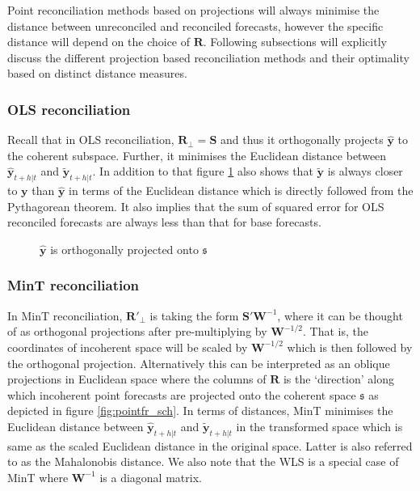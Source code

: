 \documentclass[12pt]{article}
\theoremstyle{definition}
\begin{document}
	Point reconciliation methods based on projections will always minimise the distance between unreconciled and reconciled forecasts, however the specific distance will depend on the choice of $\bm{R}$. Following subsections will explicitly discuss the different projection based reconciliation methods and their optimality based on distinct distance measures. 
	
	\subsubsection{OLS reconciliation}
	
	Recall that in OLS reconciliation, $\bm{R}_\perp=\bm{S}$ and thus it orthogonally projects $\hat{\bm{y}}$ to the coherent subspace. Further, it minimises the Euclidean distance between $\hat{\bm{y}}_{t+h|t}$ and $\tilde{\bm{y}}_{t+h|t}$. In addition to that figure \ref{fig:Schematic_OLSRecon} also shows that $\tilde{\bm{y}}$ is always closer to $\bm{y}$ than $\hat{\bm{y}}$ in terms of the Euclidean distance which is directly followed from the Pythagorean theorem. It also implies that the sum of squared error for OLS reconciled forecasts are always less than that for base forecasts.    
	
			
	\begin{figure}[H]
		\centering
		\vspace{-0.9cm}
		\tiny
		\resizebox{\linewidth}{!}{
			
		}
		\caption{$\hat{\bm{y}}$ is orthogonally projected onto $\mathfrak{s}$ }\label{fig:Schematic_OLSRecon}
	\end{figure}
	
	\subsubsection{MinT reconciliation}
	
	In MinT reconciliation, $\bm{R}'_\perp$ is taking the form $\bm{S}'{\bm{W}}^{-1}$, where it can be thought of as orthogonal projections after pre-multiplying by ${\bm{W}^{-1/2}}$. That is, the coordinates of incoherent space will be scaled by $\bm{W}^{-1/2}$ which is then followed by the orthogonal projection. Alternatively this can be interpreted as an oblique projections in Euclidean space where the columns of $\bm{R}$ is the `direction' along which incoherent point forecasts are projected onto the coherent space $\mathfrak{s}$ as depicted in figure \ref{fig:pointfr_sch}. In terms of distances, MinT minimises the Euclidean distance between $\hat{\bm{y}}_{t+h|t}$ and $\tilde{\bm{y}}_{t+h|t}$ in the transformed space which is same as the scaled Euclidean distance in the original space. Latter is also referred to as the Mahalonobis distance. We also note that the WLS is a special case of MinT where $\bm{W}^{-1}$ is a diagonal matrix. 
	
\end{document}
